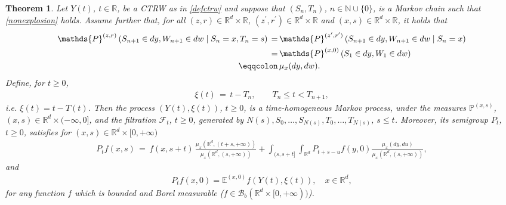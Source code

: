 \documentclass[reqno]{amsart}
\newtheorem{theorem}{Theorem}[section] %
\theoremstyle{remark}
\numberwithin{equation}{section} %
\newcommand{\RR}{\mathbb{R}}
\newcommand{\PP}{\mathds{P}}
\newcommand{\NN}{\mathbb{N}}
\newcommand{\1}{\mathds{1}}
\begin{document}
	
	\begin{theorem}
		\label{thmGS}
		Let $Y(t)$, $t\in\RR$, be a CTRW as in \eqref{defctrw} and suppose that $(S_n, T_n)$, $n\in \NN \cup \{0\}$, is a Markov chain such that \eqref{nonexplosion} holds. Assume further that, for all $(z,r) \in \mathbb{R}^d \times \mathbb{R}$, $(z^\prime,r^\prime) \in \mathbb{R}^d \times \mathbb{R}$ and $(x,s) \in \mathbb{R}^d \times \mathbb{R}$, it holds that
		\begin{align}\label{semi-jump}
			\mathds{P}^{(z,r)} \left( S_{n+1} \in dy, W_{n+1} \in dw \mid S_n = x, T_n = s \right) \, = \, &\mathds{P}^{(z^\prime,r^\prime)} \left( S_{n+1} \in dy, W_{n+1} \in dw \mid S_n = x \right) \notag \\
			= \, & \mathds{P}^{(x,0)} \left( S_1 \in dy, W_1 \in dw \right) \notag  \\
			\eqqcolon \, & \mu_x(dy,dw).
		\end{align}
		Define, for $t \geq 0$,
		\begin{align}
			\xi(t) \, = \, t-T_n, \qquad T_n\leq t < T_{n+1},
		\end{align}
		i.e. $\xi(t) = t- T(t)$.
		Then the process $(Y(t), \xi (t))$, $t \geq 0$, is a time-homogeneous Markov process, under the measures $\PP^{(x,s)}$, $(x,s)\in \RR^d\times (-\infty,0]$, and the filtration $\mathcal{F}_t$, $t \geq 0$, generated by $N(s), S_0, \dots, S_{N(s)}, T_0, \dots, T_{N(s)}$, $s \le t$. Moreover, its semigroup $P_t$, $t \geq 0$, satisfies for $(x,s)\in \RR^d\times [0,+\infty)$
		\begin{align}
			P_tf(x,s) \, = \, f(x,s+t) \, \frac{\mu_x(\mathbb{R}^d, (t+s, +\infty))}{\mu_x(\mathbb{R}^d, (s, +\infty))} + \int_{(s,s+t]} \int_{\mathbb{R}^d} P_{t+s-u}f(y,0)   \frac{\mu_x(dy, du)}{\mu_x(\mathbb{R}^d, (s, +\infty))},
			\label{transition_step}
		\end{align}
		and 
		\begin{align}
			P_tf(x,0) = \mathds{E}^{(x,0)} f(Y(t), \xi(t)), \quad x\in \RR^d,
			\label{semizero}
		\end{align}
		for any function $f$ which is bounded and Borel measurable ($f \in \mathcal{B}_b (\mathbb{R}^d \times [0, +\infty))$).
	\end{theorem}
\end{document}
